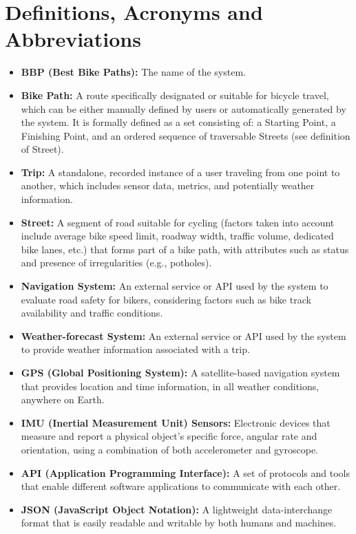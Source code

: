 \documentclass{Configuration_Files/PoliMi3i_thesis}
\begin{document}
\section{Definitions, Acronyms and Abbreviations}
\begin{itemize}

    \item \textbf{BBP (Best Bike Paths):} The name of the system.
    \item \textbf{Bike Path:} A route specifically designated or suitable for bicycle travel, which can be either manually defined by users or automatically generated by the system. It is formally defined as a set consisting of: a Starting Point, a Finishing Point, and an ordered sequence of traversable Streets (see definition of Street).
    \item \textbf{Trip:} A standalone, recorded instance of a user traveling from one point to another, which includes sensor data, metrics, and potentially weather information.
    \item \textbf{Street:} A segment of road suitable for cycling (factors taken into account include average bike speed limit, roadway width, traffic volume, dedicated bike lanes, etc.) that forms part of a bike path, with attributes such as status and presence of irregularities (e.g., potholes).
    \item \textbf{Navigation System:} An external service or API used by the system to evaluate road safety for bikers, considering factors such as bike track availability and traffic conditions.
    \item \textbf{Weather-forecast System:} An external service or API used by the system to provide weather information associated with a trip.
    \item \textbf{GPS (Global Positioning System):} A satellite-based navigation system that provides location and time information, in all weather conditions, anywhere on Earth.
    \item \textbf{IMU (Inertial Measurement Unit) Sensors:} Electronic devices that measure and report a physical object's specific force, angular rate and orientation, using a combination of both accelerometer and gyroscope.
    \item \textbf{API (Application Programming Interface):} A set of protocols and tools that enable different software applications to communicate with each other.
    \item \textbf{JSON (JavaScript Object Notation):} A lightweight data-interchange format that is easily readable and writable by both humans and machines.

\end{itemize}
\end{document}
